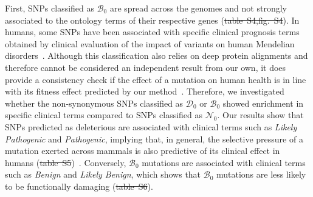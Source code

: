 \documentclass[10pt,letterpaper]{article}
\newcommand{\SphyDel}{\mathcal{D}_0}
\newcommand{\SphyNeu}{\mathcal{N}_0}
\newcommand{\SphyBen}{\mathcal{B}_0}
\providecommand{\DIFaddtex}[1]{{\protect\color{blue}\uwave{#1}}} %
\providecommand{\DIFdeltex}[1]{{\protect\color{red}\sout{#1}}}                      %
\providecommand{\DIFaddbegin}{} %
\providecommand{\DIFaddend}{} %
\providecommand{\DIFdelbegin}{} %
\providecommand{\DIFdelend}{} %
\providecommand{\DIFadd}[1]{\texorpdfstring{\DIFaddtex{#1}}{#1}} %
\providecommand{\DIFdel}[1]{\texorpdfstring{\DIFdeltex{#1}}{}} %
\newcommand{\DIFscaledelfig}{0.5}
\newlength{\DIFdelgraphicswidth} %
\newlength{\DIFdelgraphicsheight} %
\newcommand{\DIFaddincludegraphics}[2][]{{\color{blue}\fbox{\DIFOincludegraphics[#1]{#2}}}} %
\newcommand{\DIFdelincludegraphics}[2][]{%
\sbox{\DIFdelgraphicsbox}{\DIFOincludegraphics[#1]{#2}}%
\settoboxwidth{\DIFdelgraphicswidth}{\DIFdelgraphicsbox} %
\settoboxtotalheight{\DIFdelgraphicsheight}{\DIFdelgraphicsbox} %
\scalebox{\DIFscaledelfig}{%
\parbox[b]{\DIFdelgraphicswidth}{\usebox{\DIFdelgraphicsbox}\\[-\baselineskip] \rule{\DIFdelgraphicswidth}{0em}}\llap{\resizebox{\DIFdelgraphicswidth}{\DIFdelgraphicsheight}{%
\setlength{\unitlength}{\DIFdelgraphicswidth}%
\begin{picture}(1,1)%
\thicklines\linethickness{2pt} %
{\color[rgb]{1,0,0}\put(0,0){\framebox(1,1){}}}%
{\color[rgb]{1,0,0}\put(0,0){\line( 1,1){1}}}%
{\color[rgb]{1,0,0}\put(0,1){\line(1,-1){1}}}%
\end{picture}%
}\hspace*{3pt}}} %
} %
\DeclareRobustCommand{\DIFaddbegin}{\DIFOaddbegin \let\includegraphics\DIFaddincludegraphics} %
\DeclareRobustCommand{\DIFaddend}{\DIFOaddend \let\includegraphics\DIFOincludegraphics} %
\DeclareRobustCommand{\DIFdelbegin}{\DIFOdelbegin \let\includegraphics\DIFdelincludegraphics} %
\DeclareRobustCommand{\DIFdelend}{\DIFOaddend \let\includegraphics\DIFOincludegraphics} %
\begin{document}
First, SNPs classified as $\SphyBen$ are spread across the genomes and not strongly associated to the ontology terms of their respective genes (\DIFdelbegin \DIFdel{table~S4,fig.~S4}\DIFdelend \DIFaddbegin {}\DIFadd{,~}\DIFaddend ).
In humans, some SNPs have been associated with specific clinical prognosis terms obtained by clinical evaluation of the impact of variants on human Mendelian disorders~\cite{landrum_clinvar_2018}.
Although this classification also relies on deep protein alignments and therefore cannot be considered an independent result from our own, it does provide a consistency check if the effect of a mutation on human health is in line with its fitness effect predicted by our method~\cite{grimm_evaluation_2015}.
Therefore, we investigated whether the non-synonymous SNPs classified as $\SphyDel$ or $\SphyBen$ showed enrichment in specific clinical terms compared to SNPs classified as $\SphyNeu$.
Our results show that SNPs predicted as deleterious are associated with clinical terms such as \textit{Likely Pathogenic} and \textit{Pathogenic}, implying that, in general, the selective pressure of a mutation exerted across mammals is also predictive of its clinical effect in humans (\DIFdelbegin \DIFdel{table~S5}\DIFdelend \DIFaddbegin {}\DIFaddend )~\cite{sullivan_leveraging_2023}.
Conversely, $\SphyBen$ mutations are associated with clinical terms such as \textit{Benign} and \textit{Likely Benign}, which shows that $\SphyBen$ mutations are less likely to be functionally damaging (\DIFdelbegin \DIFdel{table~S6}\DIFdelend \DIFaddbegin {}\DIFaddend ).
\end{document}
